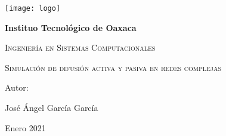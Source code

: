 \documentclass{article}
\begin{document}
		
	\begin{titlepage}
		\centering
		{\texttt{[image: logo]}\par}
		\vspace{1cm}
		{\bfseries\LARGE Instituo Tecnológico de Oaxaca \par}
		\vspace{1cm}
		{\scshape\Large Ingeniería en Sistemas Computacionales  \par}
		\vspace{1cm}
		{\scshape\Huge Simulación de difusión activa y pasiva en redes
			complejas \par}
		\vspace{3cm}
		\vfill
		{\Large Autor: \par}
		{\Large José Ángel García García \par}
		\vfill
		{\Large Enero 2021 \par}
		\end{titlepage}
	
\tableofcontents
\newpage
	
\end{document}
